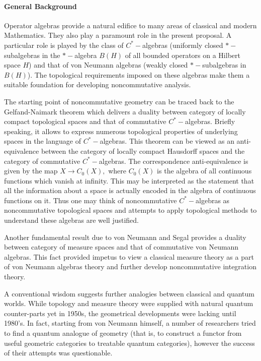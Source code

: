 \documentclass{article}
\begin{document}
\paragraph*{General Background}

Operator algebras provide a natural edifice to many areas of classical and modern Mathematics. They also play a paramount role in the present proposal. A particular role is played by the class of $C^{\ast}-$algebras (uniformly closed $\ast-$subalgebras in the $\ast-$algebra $B(H)$  of all bounded operators on a Hilbert space $H$) and that of von Neumann algebras (weakly closed $\ast-$subalgebras in $B(H)$). The topological requirements imposed on these algebras make them a suitable foundation for developing noncommutative analysis. 

The starting point of noncommutative geometry can be traced back to the Gelfand-Naimark theorem which delivers a duality between category of locally compact topological spaces and that of commutative $C^{\ast}-$algebras. Briefly speaking, it allows to express numerous topological properties of underlying spaces in the language of $C^{\ast}-$algebras. This   theorem can be viewed as an anti-equivalence between the category of locally compact Hausdorff spaces and the category of commutative $C^{\ast}-$algebras. The correspondence anti-equivalence is given by the map $X\to C_0(X),$ where $C_0(X)$ is the algebra of all continuous functions which vanish at infinity. This may be interpreted as the statement that all the information about a space is actually encoded in the algebra of continuous functions on it. Thus one may think of noncommutative $C^{\ast}-$algebras as noncommutative topological spaces and attempts to apply topological methods to understand these algebras are well justified. 

Another fundamental result due to von Neumann and Segal provides a duality between category of measure spaces and that of commutative von Neumann algebras. This fact provided impetus to view a classical measure theory as a part of von Neumann algebras theory and further develop noncommutative integration theory.

A conventional wisdom suggests further analogies between classical and quantum worlds.  While topology and measure theory were supplied with natural quantum counter-parts yet in 1950s, the geometrical developments were lacking until 1980's. In fact, starting from von Neumann himself, a number of researchers tried to find a quantum analogue of geometry (that is, to construct a functor from useful geometric categories to treatable quantum categories), however the success of their attempts was questionable.
\end{document}
